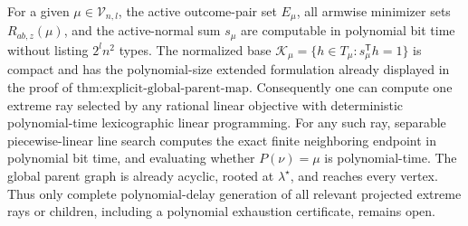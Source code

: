 For a given \(\mu\in\mathcal V_{n,l}\), the active outcome-pair set \(E_\mu\), all armwise minimizer sets \(R_{ab,z}(\mu)\), and the active-normal sum \(s_\mu\) are computable in polynomial bit time without listing \(2^l n^2\) types. The normalized base \(\mathcal K_\mu=\{h\in T_\mu:s_\mu^{\mathsf T}h=1\}\) is compact and has the polynomial-size extended formulation already displayed in the proof of \(\text{thm:explicit-global-parent-map}\). Consequently one can compute one extreme ray selected by any rational linear objective with deterministic polynomial-time lexicographic linear programming. For any such ray, separable piecewise-linear line search computes the exact finite neighboring endpoint in polynomial bit time, and evaluating whether \(P(\nu)=\mu\) is polynomial-time. The global parent graph is already acyclic, rooted at \(\lambda^\star\), and reaches every vertex. Thus only complete polynomial-delay generation of all relevant projected extreme rays or children, including a polynomial exhaustion certificate, remains open.